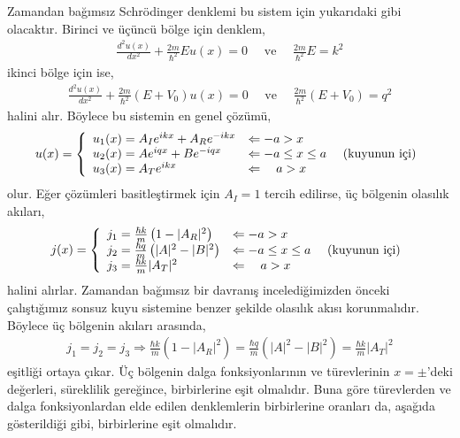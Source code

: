 \documentclass[a4paper,12pt, twoside]{article}
\begin{document}
Zamandan bağımsız Schrödinger denklemi bu sistem için yukarıdaki gibi olacaktır. Birinci ve üçüncü bölge için denklem,
\begin{align}
\frac { d ^ { 2 } u ( x ) } { d x ^ { 2 } } +  \frac { 2 m} { \hbar ^ { 2 } } E u ( x ) = 0 \quad \text{ ve } \quad \frac { 2 m} { \hbar ^ { 2 } } E = k ^ { 2 }
\end{align}
ikinci bölge için ise,
\begin{align}
\frac { d ^ { 2 } u ( x ) } { d x ^ { 2 } } +  \frac { 2 m} { \hbar ^ { 2 } }  \left( E + V _ { 0 } \right) u ( x ) = 0 \quad \text{ ve } \quad \frac { 2 m} { \hbar ^ { 2 } }  \left( E + V _ { 0 } \right) = q ^ { 2 }
\end{align}
halini alır. Böylece bu sistemin en genel çözümü,
\begin{align}
u ( x )  = \left\{ 
\begin{array} { l l } 
{u_1(x) = A_I e^{i k x} + A_R e^{-i k x} } & {\Leftarrow -a > x } \\
{u_2(x) = A e^{i q x} + B e^{-i q x} } & {\Leftarrow -a \leq x \leq a } \quad \text{ (kuyunun içi)} \\
{u_3(x) = A_T e^{i k x}} & {\Leftarrow \quad a > x }
\end{array} \right. 
\end{align}
olur. Eğer çözümleri basitleştirmek için $A_I=1$ tercih edilirse, üç bölgenin olasılık akıları,
\begin{align}
j ( x )  = \left\{ 
\begin{array} { l l } 
{j_1 = \frac{\hbar k}{m}\left(1-|A_R|^{2}\right) } & {\Leftarrow -a > x } \\
{j_2 = \frac{\hbar q}{m}\left(|A|^{2}-|B|^{2}\right) } & {\Leftarrow -a \leq x \leq a } \quad \text{ (kuyunun içi)} \\
{j_3 = \frac{\hbar k}{m}|A_T|^{2}} & {\Leftarrow \quad a > x }
\end{array} \right. 
\end{align}
halini alırlar. Zamandan bağımsız bir davranış incelediğimizden önceki çalıştığımız sonsuz kuyu sistemine benzer şekilde olasılık akısı korunmalıdır. Böylece üç bölgenin akıları arasında,
\begin{align}
	j_1 = 	j_2 = 	j_3 \Longrightarrow \frac{\hbar k}{m}\left(1-|A_R|^{2}\right)=\frac{\hbar q}{m}\left(|A|^{2}-|B|^{2}\right)=\frac{\hbar k}{m}|A_T|^{2}
	\label{eq:sonlukuyu_j1j2j3}
\end{align}
eşitliği ortaya çıkar. Üç bölgenin dalga fonksiyonlarının ve türevlerinin $x=\pm$'deki değerleri, süreklilik gereğince, birbirlerine eşit olmalıdır. Buna göre türevlerden ve dalga fonksiyonlardan elde edilen denklemlerin birbirlerine oranları da, aşağıda gösterildiği gibi, birbirlerine eşit olmalıdır. 
\end{document}
